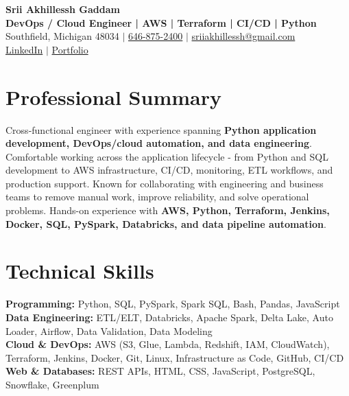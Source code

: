 \documentclass[letterpaper,10pt]{article}
\begin{document}
\fontsize{9.35pt}{10.45pt}\selectfont

\begin{center}
    {\LARGE \textbf{Srii Akhillessh Gaddam}} \\[-1pt]
    \textbf{DevOps / Cloud Engineer | AWS | Terraform | CI/CD | Python} \\[2pt]
    Southfield, Michigan 48034 $|$
    \href{tel:6468752400}{646-875-2400} $|$
    \href{mailto:sriiakhillessh@gmail.com}{sriiakhillessh@gmail.com} \\[1pt]
    \href{https://www.linkedin.com/in/srii-akhiilessh-gaddam-b48668191/}{LinkedIn} $|$
    \href{https://sriiakhillesshg.github.io/portfolio/}{Portfolio}
\end{center}
\vspace{-8pt}

\section{Professional Summary}
\small{Cross-functional engineer with experience spanning \textbf{Python application development, DevOps/cloud automation, and data engineering}. Comfortable working across the application lifecycle - from Python and SQL development to AWS infrastructure, CI/CD, monitoring, ETL workflows, and production support. Known for collaborating with engineering and business teams to remove manual work, improve reliability, and solve operational problems. Hands-on experience with \textbf{AWS, Python, Terraform, Jenkins, Docker, SQL, PySpark, Databricks, and data pipeline automation}.}

\section{Technical Skills}
\small{
\textbf{Programming:} Python, SQL, PySpark, Spark SQL, Bash, Pandas, JavaScript \\
\textbf{Data Engineering:} ETL/ELT, Databricks, Apache Spark, Delta Lake, Auto Loader, Airflow, Data Validation, Data Modeling \\
\textbf{Cloud \& DevOps:} AWS (S3, Glue, Lambda, Redshift, IAM, CloudWatch), Terraform, Jenkins, Docker, Git, Linux, Infrastructure as Code, GitHub, CI/CD \\
\textbf{Web \& Databases:} REST APIs, HTML, CSS, JavaScript, PostgreSQL, Snowflake, Greenplum
}
\end{document}
